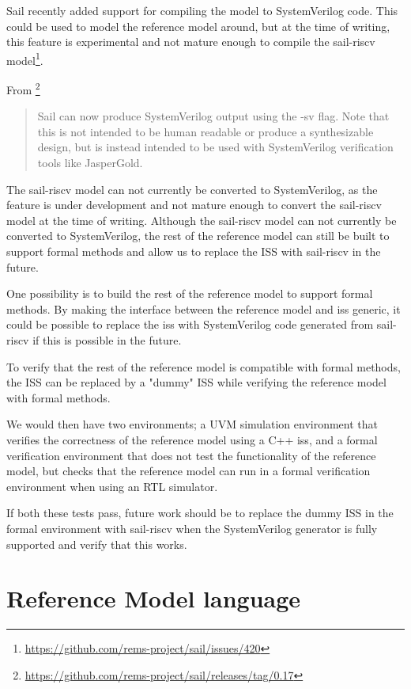 Sail recently added support for compiling the model to SystemVerilog code. This could be used to model the reference model around, but at the time of writing, this feature is experimental and not mature enough to compile the sail-riscv model\footnote{\url{https://github.com/rems-project/sail/issues/420}}.

From \footnote{\url{https://github.com/rems-project/sail/releases/tag/0.17}}

\begin{quote}
    
Sail can now produce SystemVerilog output using the -sv flag. Note
that this is not intended to be human readable or produce a
synthesizable design, but is instead intended to be used with
SystemVerilog verification tools like JasperGold.
\end{quote}

The sail-riscv model can not currently be converted to SystemVerilog, as the feature is under development and not mature enough to convert the sail-riscv model at the time of writing.\cite{}
Although the sail-riscv model can not currently be converted to SystemVerilog, the rest of the reference model can still be built to support formal methods and allow us to replace the ISS with sail-riscv in the future.

One possibility is to build the rest of the reference model to support formal methods. By making the interface between the reference model and \acrshort{iss} generic, it could be possible to replace the \acrshort{iss} with SystemVerilog code generated from sail-riscv if this is possible in the future.


To verify that the rest of the reference model is compatible with formal methods, the ISS can be replaced by a "dummy" ISS while verifying the reference model with formal methods. 


We would then have two environments; a UVM simulation environment that verifies the correctness of the reference model using a C++ \acrshort{iss}, and a formal verification environment that does not test the functionality of the reference model, but checks that the reference model can run in a formal verification environment when using an RTL simulator.

If both these tests pass, future work should be to replace the dummy ISS in the formal environment with sail-riscv when the SystemVerilog generator is fully supported and verify that this works. 


\section{Reference Model language}

